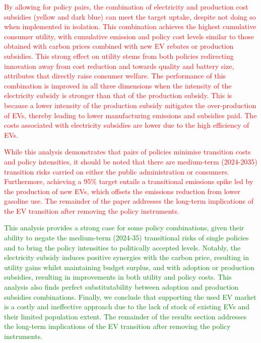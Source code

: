 \documentclass[12pt]{article}
\begin{document}
	\textcolor{red}{By allowing for policy pairs, the combination of electricity and production cost subsidies (yellow and dark blue) can meet the target uptake, despite not doing so when implemented in isolation. This combination achieves the highest cumulative consumer utility, with cumulative emission and policy cost levels similar to those obtained with carbon prices combined with new EV rebates or production subsidies. This strong effect on utility stems from both policies redirecting innovation away from cost reduction and towards quality and battery size, attributes that directly raise consumer welfare. The performance of this combination is improved in all three dimensions when the intensity of the electricity subsidy is stronger than that of the production subsidy. This is because a lower intensity of the production subsidy mitigates the over-production of EVs, thereby leading to lower manufacturing emissions and subsidies paid. The costs associated with electricity subsidies are lower due to the high efficiency of EVs.}

    \textcolor{red}{While this analysis demonstrates that pairs of policies minimise transition costs and policy intensities, it should be noted that there are medium-term (2024-2035) transition risks carried on either the public administration or consumers. Furthermore, achieving a 95\% target entails a transitional emissions spike led by the production of new EVs, which offsets the emissions reduction from lower gasoline use. The remainder of the paper addresses the long-term implications of the EV transition after removing the policy instruments.}  

    \textcolor{green}{This analysis provides a strong case for some policy combinations, given their ability to negate the medium-term (2024-35) transitional risks of single policies and to bring the policy intensities to politically accepted levels. Notably, the electricity subsidy induces positive synergies with the carbon price, resulting in utility gains whilst maintaining budget surplus, and with adoption or production subsidies, resulting in improvements in both utility and policy costs. This analysis also finds perfect substitutability between adoption and production subsidies combinations. Finally, we conclude that supporting the used EV market is a costly and ineffective approach due to the lack of stock of existing EVs and their limited population extent. 
    The remainder of the results section addresses the long-term implications of the EV transition after removing the policy instruments.}
\end{document}
